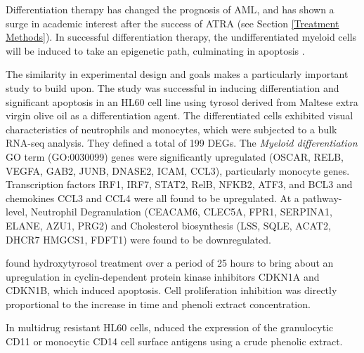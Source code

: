 Differentiation therapy has changed the prognosis of \ac{AML}, and has shown a surge in academic interest after the success of \ac{ATRA} (see Section \ref{Treatment Methods}). In successful differentiation therapy, the undifferentiated myeloid cells will be induced to take an epigenetic path, culminating in apoptosis \citep{santos2000expression, mark2017transcriptomes}. 

The similarity in experimental design and goals makes \cite{gatt2021tyrosol} a particularly important study to build upon. The study was successful in inducing differentiation and significant apoptosis in an HL60 cell line using tyrosol derived from Maltese extra virgin olive oil as a differentiation agent. The differentiated cells exhibited visual characteristics of neutrophils and monocytes, which were subjected to a bulk RNA-seq analysis. They defined a total of 199 \ac{DEG}s. The \textit{Myeloid differentiation} \ac{GO} term (\ac{GO}:0030099) genes were significantly upregulated (OSCAR, RELB, VEGFA, GAB2, JUNB, DNASE2, ICAM, CCL3), particularly monocyte genes. Transcription factors IRF1, IRF7, STAT2, RelB, NFKB2, ATF3, and BCL3 and chemokines CCL3 and CCL4 were all found to be upregulated. At a pathway-level, Neutrophil Degranulation (CEACAM6, CLEC5A, FPR1, SERPINA1, ELANE, AZU1, PRG2) and Cholesterol biosynthesis (LSS, SQLE, ACAT2, DHCR7 HMGCS1, FDFT1) were found to be downregulated.

\cite{fabiani2008inhibition} found hydroxytyrosol treatment over a period of 25 hours to bring about an upregulation in cyclin-dependent protein kinase inhibitors CDKN1A and CDKN1B, which induced apoptosis. Cell proliferation inhibition was directly proportional to the increase in time and phenoli extract concentration.

In multidrug resistant HL60 cells, \cite{crescimanno2009effects} nduced the expression of the granulocytic CD11 or monocytic CD14 cell surface antigens using a crude phenolic extract.



